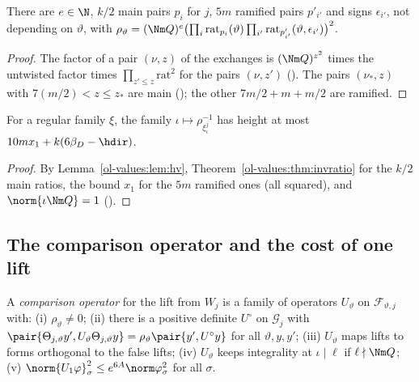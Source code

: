 \begin{lemma}\label{ol-values:lem:hv}
There are $e\in\N$, $k/2$ main pairs $p_i$ for $j$, $5m$ ramified pairs $p'_{i'}$ and signs $\epsilon_{i'}$, not
depending on $\vartheta$, with
$\rho_\vartheta=(\Nm Q)^e\bigl(\prod_i\mathrm{rat}_{p_i}(\vartheta)\prod_{i'}\mathrm{rat}_{p'_{i'}}(\vartheta,\epsilon_{i'})\bigr)^2$.
\end{lemma}

\begin{proof}
The factor of a pair $(\nu,z)$ of the exchanges is $(\Nm Q)^{z^2}$ times the untwisted factor times
$\prod_{z'\le z}\mathrm{rat}^2$ for the pairs $(\nu,z')$ (). The pairs
$(\nu_*,z)$ with $7(m/2)<z\le z_*$ are main ();
the other $7m/2+m+m/2$ are ramified.
\end{proof}

\begin{corollary}\label{ol-values:cor:hv}
For a regular family $\xi$, the family $\iota\mapsto\rho_{\xi_\iota^j}^{-1}$ has height at
most $10mx_1+k(6\beta_D-\hdir)$.
\end{corollary}

\begin{proof}
By Lemma~\ref{ol-values:lem:hv}, Theorem~\ref{ol-values:thm:invratio} for the $k/2$ main
ratios, the bound $x_1$ for the $5m$ ramified ones (all squared), and $\norm{\iota\Nm Q}=1$
().
\end{proof}

\subsection{The comparison operator and the cost of one lift}

\begin{definition}\label{ol-values:def:comp}
A \emph{comparison operator} for the lift from $W_j$ is a family of operators $U_\vartheta$ on
$\mathcal F_{\vartheta,j}$ with: (i) $\rho_\vartheta\ne0$; (ii) there is a positive definite
$U^\circ$ on $\mathcal G_j$ with $\pair{\Theta_{j,\vartheta}y',U_\vartheta\Theta_{j,\vartheta}y}=
\rho_\vartheta\pair{y',U^\circ y}$ for all $\vartheta,y,y'$; (iii) $U_\vartheta$ maps lifts to
forms orthogonal to the false lifts; (iv) $U_\vartheta$ keeps integrality at $\iota\mid\ell$ if
$\ell\nmid\Nm Q$; (v) $\norm{U_1\varphi}^2_\sigma\le e^{6A}\norm\varphi^2_\sigma$ for all $\sigma$.
\end{definition}

